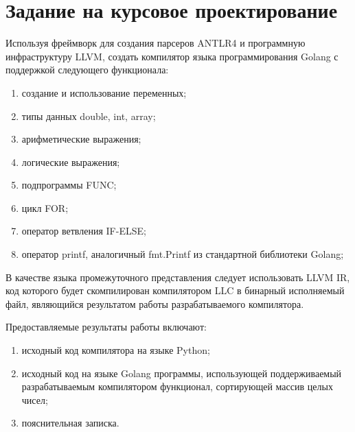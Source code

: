 \section*{Задание на курсовое проектирование}

Используя фреймворк для создания парсеров ANTLR4 и программную инфраструктуру LLVM, создать компилятор
языка программирования Golang с поддержкой следующего функционала:
\begin{enumerate}
    \item создание и использование переменных;
    \item типы данных double, int, array;
    \item арифметические выражения;
    \item логические выражения;
    \item подпрограммы FUNC;
    \item цикл FOR;
    \item оператор ветвления IF-ELSE;
    \item оператор printf, аналогичный fmt.Printf из стандартной библиотеки Golang;
\end{enumerate}

В качестве языка промежуточного представления следует использовать LLVM IR, код которого будет скомпилирован
компилятором LLC в бинарный исполняемый файл, являющийся результатом работы разрабатываемого компилятора.

Предоставляемые результаты работы включают:
\begin{enumerate}
    \item исходный код компилятора на языке Python;
    \item исходный код на языке Golang программы, использующей поддерживаемый разрабатываемым компилятором функционал,
    сортирующей массив целых чисел;
    \item пояснительная записка.
\end{enumerate}